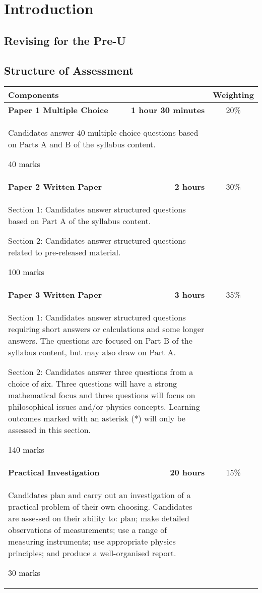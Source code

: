 \documentclass[main.tex]{subfiles}
\begin{document}
\chapter{Introduction}
\section{Revising for the Pre-U}
\newpage
\section{Structure of Assessment}
\begin{table}[h]
  \begin{tabular}{|lr|c|}
    \hline
    \textbf{Components} & & \textbf{Weighting} \\
    \hline
    \textbf{Paper 1 Multiple Choice} & \textbf{1 hour 30 minutes} & 20\% \\
    \multicolumn{2}{|p{10cm}|}{Candidates answer 40 multiple-choice questions based on Parts A and B of the syllabus content.

40 marks} & \\ \hline
\textbf{Paper 2 Written Paper} & \textbf{2 hours} & 30\% \\
\multicolumn{2}{|p{10cm}|}{Section 1: Candidates answer structured questions based on Part A of the syllabus
content.

Section 2: Candidates answer structured questions related to pre-released material.

100 marks} & \\ \hline
\textbf{Paper 3 Written Paper} & \textbf{3 hours} & 35\% \\
\multicolumn{2}{|p{10cm}|}{Section 1: Candidates answer structured questions requiring short answers or calculations and some longer answers. The questions are focused on Part B of the syllabus content, but may also draw on Part A.

Section 2: Candidates answer three questions from a choice of six. Three questions will have a strong mathematical focus and three questions will focus on philosophical issues and/or physics concepts. Learning outcomes marked with an asterisk (*) will only be assessed in this section.

140 marks} & \\ \hline
\textbf{Practical Investigation} & \textbf{20 hours} & 15\% \\
\multicolumn{2}{|p{10cm}|}{Candidates plan and carry out an investigation of a practical problem of their own choosing. Candidates are assessed on their ability to: plan; make detailed observations of measurements; use a range of measuring instruments; use appropriate physics principles; and produce a well-organised report.

30 marks} & \\ \hline
  \end{tabular}
\end{table}
\end{document}
